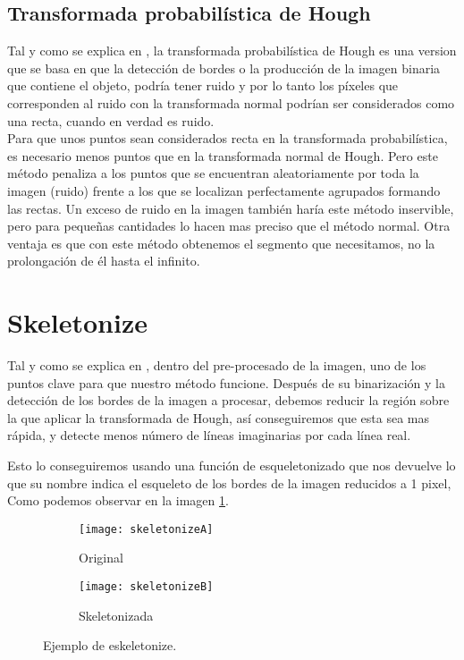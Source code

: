 \subsection{Transformada probabilística de Hough}

Tal y como se explica en \cite{Kiryati20001157}, la transformada probabilística de Hough es una version que se basa en que la detección de bordes o la producción de la imagen binaria que contiene el objeto, podría tener ruido y por lo tanto los píxeles que corresponden al ruido con la transformada normal podrían ser considerados como una recta, cuando en verdad es ruido.\\

Para que unos puntos sean considerados recta en la transformada probabilística, es necesario menos puntos que en la transformada normal de Hough.
Pero este método penaliza a los puntos que se encuentran aleatoriamente por toda la imagen (ruido) frente a los que se localizan perfectamente agrupados formando las rectas. 
Un exceso de ruido en la imagen también haría este método inservible, pero para pequeñas cantidades lo hacen mas preciso que el método normal.
Otra ventaja es que con este método obtenemos el segmento que necesitamos, no la prolongación de él hasta el infinito.

\section{Skeletonize }
Tal y como se explica en \cite{scik:skeleton}, dentro del pre-procesado de la imagen, uno de los puntos clave para que nuestro método funcione.
Después de su binarización y la detección de los bordes de la imagen a procesar, debemos reducir la región sobre la que aplicar la transformada de Hough, así conseguiremos que esta sea mas rápida, y detecte menos número de líneas imaginarias por cada línea real.

Esto lo conseguiremos usando una función de esqueletonizado que nos devuelve lo que su nombre indica el esqueleto de los bordes de la imagen reducidos a 1 pixel, Como podemos observar en la imagen \ref{fig:3.6}.


\begin{figure}
\begin{subfigure}[b]{.5\linewidth}
\centering\large \texttt{[image: skeletonizeA]}
\caption{Original}
\end{subfigure}%
\begin{subfigure}[b]{.5\linewidth}
\centering\large \texttt{[image: skeletonizeB]}
\caption{Skeletonizada}
\end{subfigure}
\caption{Ejemplo de eskeletonize.}\label{fig:3.6}
\end{figure}


